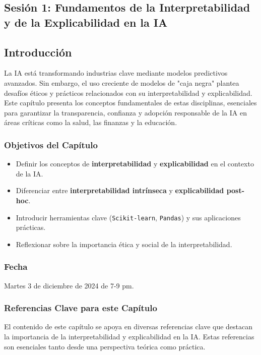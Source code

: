 \begin{refsection}
\chapter{Sesión 1: Fundamentos de la Interpretabilidad y de la Explicabilidad en la IA}
\label{chapter:chapter-1}

\section{Introducción}
La IA está transformando industrias clave mediante modelos predictivos avanzados. Sin embargo, el uso creciente de modelos de "caja negra" plantea desafíos éticos y prácticos relacionados con su interpretabilidad y explicabilidad. Este capítulo presenta los conceptos fundamentales de estas disciplinas, esenciales para garantizar la transparencia, confianza y adopción responsable de la IA en áreas críticas como la salud, las finanzas y la educación.

\subsection{Objetivos del Capítulo}
\begin{itemize}
    \item Definir los conceptos de \textbf{interpretabilidad} y \textbf{explicabilidad} en el contexto de la IA.
    \item Diferenciar entre \textbf{interpretabilidad intrínseca} y \textbf{explicabilidad post-hoc}.
    \item Introducir herramientas clave (\texttt{Scikit-learn}, \texttt{Pandas}) y sus aplicaciones prácticas.
    \item Reflexionar sobre la importancia ética y social de la interpretabilidad.
\end{itemize}

\subsection{Fecha}

Martes 3 de diciembre de 2024 de 7-9 pm.

\subsection{Referencias Clave para este Capítulo}
El contenido de este capítulo se apoya en diversas referencias clave que destacan la importancia de la interpretabilidad y explicabilidad en la IA. Estas referencias son esenciales tanto desde una perspectiva teórica como práctica.


\end{refsection}
